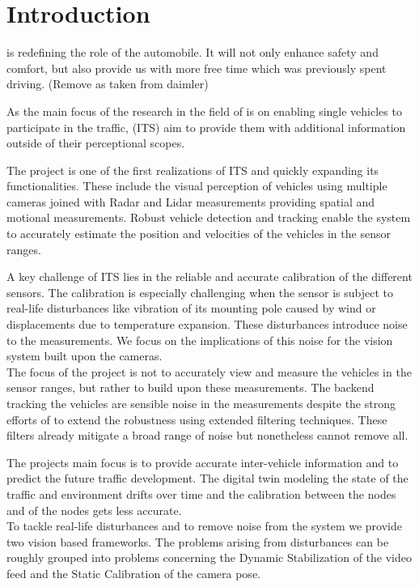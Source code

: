 
\section{Introduction}
\AD{} is redefining the role of the automobile.
It will not only enhance safety and comfort, but also provide us with more free time which was previously spent driving. (Remove as taken from daimler) 

As the main focus of the research in the field of \AD{} is on enabling single vehicles to participate in the traffic,
\ITS{} (ITS) aim to provide them with additional information outside of their perceptional scopes.

The \Providentia{} project is one of the first realizations of ITS and quickly expanding its functionalities. These include the visual perception of vehicles using multiple cameras joined with Radar and Lidar measurements providing spatial and motional measurements.
Robust vehicle detection and tracking enable the system to accurately estimate the position and velocities of the vehicles in the sensor ranges.

A key challenge of ITS lies in the reliable and accurate calibration of the different sensors.
The calibration is especially challenging when the sensor is subject to real-life disturbances like vibration of its mounting pole caused by wind or displacements due to temperature expansion.
These disturbances introduce noise to the measurements. We focus on the implications of this noise for the vision system built upon the cameras.
\\

The focus of the project is not to accurately view and measure the vehicles in the sensor ranges, but rather to build upon these measurements. 
The backend tracking the vehicles are sensible noise in the measurements despite the strong efforts of to extend the robustness using extended filtering techniques. 
These filters already mitigate a broad range of noise but nonetheless cannot remove all.

The projects main focus is to provide accurate inter-vehicle information and to predict the future traffic development.
The digital twin modeling the state of the traffic and environment drifts over time and the calibration between the nodes and of the nodes gets less accurate.
\\

To tackle real-life disturbances and to remove noise from the system we provide two vision based frameworks. 
The problems arising from disturbances can be roughly grouped into problems concerning the Dynamic Stabilization of the video feed and the Static Calibration of the camera pose.

